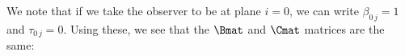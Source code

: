 We note that if we take the observer to be at plane $i =0$, we can write $\beta_{0\,j} = 1$ and $\tau_{0\,j} = 0$. Using these, we see that the $\Bmat$ and $\Cmat$ matrices are the same: